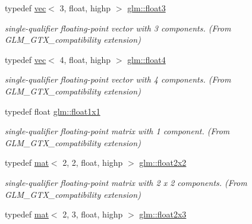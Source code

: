 \begin{DoxyCompactItemize}
typedef \hyperlink{structglm_1_1vec}{vec}$<$ 3, float, highp $>$ \hyperlink{group__gtx__compatibility_ga8bbd0db121b50b0904f9a23adb3bbc45}{glm\+::float3}
\begin{DoxyCompactList}\small\item\em single-\/qualifier floating-\/point vector with 3 components. (From G\+L\+M\+\_\+\+G\+T\+X\+\_\+compatibility extension) \end{DoxyCompactList}\item 
\mbox{\label{group__gtx__compatibility_ga5b28e8af9bfee363940882dd7d1214b5}} 
typedef \hyperlink{structglm_1_1vec}{vec}$<$ 4, float, highp $>$ \hyperlink{group__gtx__compatibility_ga5b28e8af9bfee363940882dd7d1214b5}{glm\+::float4}
\begin{DoxyCompactList}\small\item\em single-\/qualifier floating-\/point vector with 4 components. (From G\+L\+M\+\_\+\+G\+T\+X\+\_\+compatibility extension) \end{DoxyCompactList}\item 
\mbox{\label{group__gtx__compatibility_gaac1faa940ac1fbb32d4a315005b578af}} 
typedef float \hyperlink{group__gtx__compatibility_gaac1faa940ac1fbb32d4a315005b578af}{glm\+::float1x1}
\begin{DoxyCompactList}\small\item\em single-\/qualifier floating-\/point matrix with 1 component. (From G\+L\+M\+\_\+\+G\+T\+X\+\_\+compatibility extension) \end{DoxyCompactList}\item 
\mbox{\label{group__gtx__compatibility_gab3fb1cd56ec3f5407a4d3b9173bd88ae}} 
typedef \hyperlink{structglm_1_1mat}{mat}$<$ 2, 2, float, highp $>$ \hyperlink{group__gtx__compatibility_gab3fb1cd56ec3f5407a4d3b9173bd88ae}{glm\+::float2x2}
\begin{DoxyCompactList}\small\item\em single-\/qualifier floating-\/point matrix with 2 x 2 components. (From G\+L\+M\+\_\+\+G\+T\+X\+\_\+compatibility extension) \end{DoxyCompactList}\item 
\mbox{\label{group__gtx__compatibility_ga32644dc8b8177c22355e4d03b06061ac}} 
typedef \hyperlink{structglm_1_1mat}{mat}$<$ 2, 3, float, highp $>$ \hyperlink{group__gtx__compatibility_ga32644dc8b8177c22355e4d03b06061ac}{glm\+::float2x3}

\end{DoxyCompactItemize}
